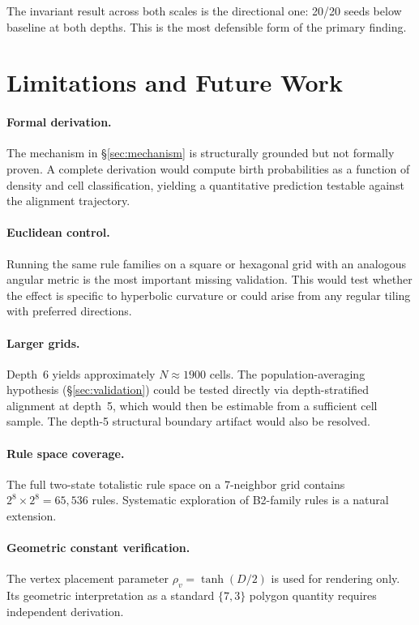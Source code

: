 \documentclass[12pt,a4paper]{article}
\begin{document}
The invariant result across both scales is the directional one: 20/20 seeds below baseline at both depths. This is the most defensible form of the primary finding.

\section{Limitations and Future Work}
\label{sec:limitations}

\paragraph{Formal derivation.}
The mechanism in \S\ref{sec:mechanism} is structurally grounded but not formally proven. A complete derivation would compute birth probabilities as a function of density and cell classification, yielding a quantitative prediction testable against the alignment trajectory.

\paragraph{Euclidean control.}
Running the same rule families on a square or hexagonal grid with an analogous angular metric is the most important missing validation. This would test whether the effect is specific to hyperbolic curvature or could arise from any regular tiling with preferred directions.

\paragraph{Larger grids.}
Depth~6 yields approximately $N\approx 1900$ cells. The population-averaging hypothesis (\S\ref{sec:validation}) could be tested directly via depth-stratified alignment at depth~5, which would then be estimable from a sufficient cell sample. The depth-5 structural boundary artifact would also be resolved.

\paragraph{Rule space coverage.}
The full two-state totalistic rule space on a 7-neighbor grid contains $2^8\times 2^8=65{,}536$ rules. Systematic exploration of B2-family rules is a natural extension.

\paragraph{Geometric constant verification.}
The vertex placement parameter $\rho_v=\tanh(D/2)$ is used for rendering only. Its geometric interpretation as a standard $\{7,3\}$ polygon quantity requires independent derivation.
\end{document}
